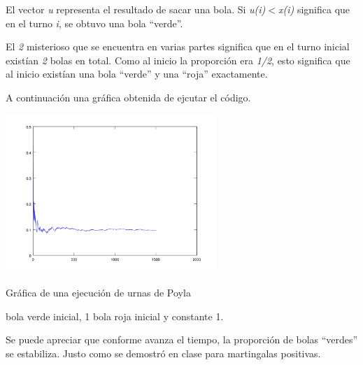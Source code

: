El vector \textsl{u} representa el resultado de sacar una bola. Si \textsl{u(i)$<$x(i)} significa que en el turno \textsl{i}, 
se obtuvo una bola ``verde''.\par\null

El \textsl{2} misterioso que se encuentra en varias partes significa que en el turno inicial existían \textsl{2} bolas en total.
Como al inicio la proporción era \textsl{1/2}, esto significa que al inicio existían una bola ``verde'' y una ``roja'' exactamente.\par\null

A continuación una gráfica obtenida de ejcutar el código.

\begin{center}
    \includegraphics[width=8cm]{tarea2/problema2_2/poyla.PNG}
\end{center}
\begin{center}
    Gráfica de una ejecución de urnas de Poyla \par{} bola verde inicial, 1 bola roja inicial y constante 1.
\end{center}\par\null

Se puede apreciar que conforme avanza el tiempo, la proporción de bolas ``verdes'' se estabiliza. Justo como se demostró en clase para
martingalas positivas.